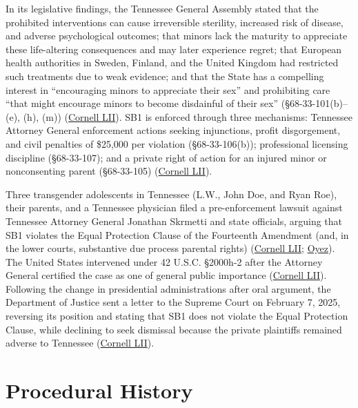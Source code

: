 \documentclass[12pt]{article}
\begin{document}
In its legislative findings, the Tennessee General Assembly stated that the prohibited interventions can cause irreversible sterility, increased risk of disease, and adverse psychological outcomes; that minors lack the maturity to appreciate these life-altering consequences and may later experience regret; that European health authorities in Sweden, Finland, and the United Kingdom had restricted such treatments due to weak evidence; and that the State has a compelling interest in ``encouraging minors to appreciate their sex'' and prohibiting care ``that might encourage minors to become disdainful of their sex'' (\S 68-33-101(b)--(e), (h), (m)) (\href{https://www.law.cornell.edu/supremecourt/text/23-477}{Cornell LII}). SB1 is enforced through three mechanisms: Tennessee Attorney General enforcement actions seeking injunctions, profit disgorgement, and civil penalties of \$25,000 per violation (\S 68-33-106(b)); professional licensing discipline (\S 68-33-107); and a private right of action for an injured minor or nonconsenting parent (\S 68-33-105) (\href{https://www.law.cornell.edu/supremecourt/text/23-477}{Cornell LII}).

Three transgender adolescents in Tennessee (L.W., John Doe, and Ryan Roe), their parents, and a Tennessee physician filed a pre-enforcement lawsuit against Tennessee Attorney General Jonathan Skrmetti and state officials, arguing that SB1 violates the Equal Protection Clause of the Fourteenth Amendment (and, in the lower courts, substantive due process parental rights) (\href{https://www.law.cornell.edu/supremecourt/text/23-477}{Cornell LII}; \href{https://www.oyez.org/cases/2024/23-477}{Oyez}). The United States intervened under 42 U.S.C. \S 2000h-2 after the Attorney General certified the case as one of general public importance (\href{https://www.law.cornell.edu/supremecourt/text/23-477}{Cornell LII}). Following the change in presidential administrations after oral argument, the Department of Justice sent a letter to the Supreme Court on February 7, 2025, reversing its position and stating that SB1 does not violate the Equal Protection Clause, while declining to seek dismissal because the private plaintiffs remained adverse to Tennessee (\href{https://www.law.cornell.edu/supremecourt/text/23-477}{Cornell LII}).

\section{Procedural History}
\end{document}
